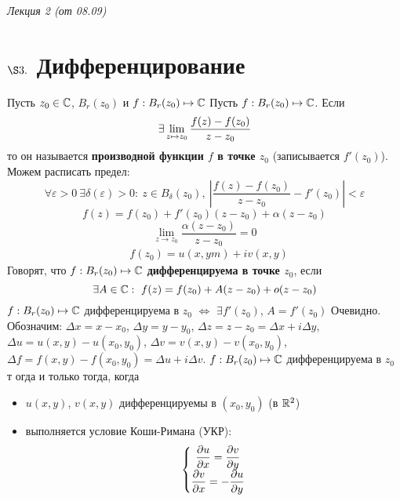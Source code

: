 \begin{flushright}
    \textit{Лекция 2 (от 08.09)}
\end{flushright}
\section{$\S 3.$ Дифференцирование}
Пусть $z_0 \in \mathbb{C}$, $B_r(z_0)$ и $f: B_r(z_0) \mapsto \mathbb{C}$
\Def
Пусть $f: B_r(z_0) \mapsto \mathbb{C}$. Если
\begin{equation}\label{(3.1)}
    \exists \displaystyle \lim_{z \mapsto z_0} \frac{f(z)-f(z_0)}{z-z_0}
\end{equation}
то он называется \textbf{производной функции $f$ в точке $z_0$} (записывается
$f'(z_0)$).
\\
Можем расписать предел:
\begin{equation}\label{(3.2)}
    \forall \varepsilon > 0 \ \exists \delta(\varepsilon)>0: \ z \in B_\delta(z_0), \ \left| \frac{f(z) - f(z_0)}{z-z_0} - f'(z_0) \right| < \varepsilon
\end{equation}
\begin{equation}\label{(3.3)}
    f(z) = f(z_0) + f'(z_0)(z-z_0) + \alpha(z-z_0)
\end{equation}
\begin{equation}\label{(3.4)}
    \lim_{z \to z_0}\frac{\alpha(z-z_0)}{z-z_0} = 0
\end{equation}
\begin{align*}
  & f(z_0) = u(x,ym) + iv(x,y)
\end{align*}
\Def
Говорят, что $f: B_r(z_0) \mapsto \mathbb{C}$ \textbf{дифференцируема в точке $z_0$},
если
\begin{equation}\label{(3.5)}
    \exists A \in \mathbb{C}: \ f(z) = f(z_0)+A(z-z_0)+o(z-z_0)
\end{equation}
\lemma
$f: B_r(z_0) \mapsto \mathbb{C}$ дифференцируема в $z_0$ $\Leftrightarrow$ $\exists
f'(z_0)$, $A = f'(z_0)$
\pr
Очевидно.
\\
Обозначим: $\Delta x = x-x_0$, $\Delta y = y - y_0$, $\Delta z = z-z_0 = \Delta
x + i \Delta y$, $\Delta u = u(x,y)-u(x_0,y_0)$, $\Delta v = v(x,y)-v(x_0,y_0)$,
$\Delta f = f(x,y)-f(x_0,y_0) = \Delta u + i \Delta v$.
\theorem
$f: B_r(z_0) \mapsto \mathbb{C}$ дифференцируема в $z_0$ т огда и только тогда, когда
\begin{itemize}
    \item $u(x,y)$, $v(x,y)$ дифференцируемы в $(x_0,y_0)$ (в $\mathbb{R}^2$)
    \item выполняется условие Коши-Римана (УКР):
    \begin{equation}\label{(3.6)}
        \left\{ \begin{matrix}
                \displaystyle \frac{\partial u}{\partial x} = \displaystyle \frac{\partial v}{\partial y} \\
                \displaystyle \frac{\partial v}{\partial x} = - \displaystyle \frac{\partial u}{\partial y}
            \end{matrix} \right.
    \end{equation}
\end{itemize}
